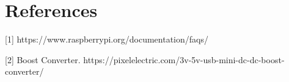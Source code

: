 \pagebreak
\section{References}
\label{sec:References}
[1] https://www.raspberrypi.org/documentation/faqs/

[2] Boost Converter. https://pixelelectric.com/3v-5v-usb-mini-dc-dc-boost-converter/
